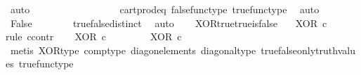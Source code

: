 \begin{isabellebody}
\ auto\isanewline
\ \ \ \ \isamarkupfalse%
\ \isamarkupfalse%
\ {\isachardoublequoteopen}{\isasymt}\ {\isacharequal}{\kern0pt}\ {\isasymf}{\isachardoublequoteclose}\isanewline
\ \ \ \ \ \ \isamarkupfalse%
\ cart{\isacharunderscore}{\kern0pt}prod{\isacharunderscore}{\kern0pt}eq{}\ false{\isacharunderscore}{\kern0pt}func{\isacharunderscore}{\kern0pt}type\ true{\isacharunderscore}{\kern0pt}func{\isacharunderscore}{\kern0pt}type\ \isamarkupfalse%
\ auto\isanewline
\ \ \ \ \isamarkupfalse%
\ \isamarkupfalse%
\ False\isanewline
\ \ \ \ \ \ \isamarkupfalse%
\ true{\isacharunderscore}{\kern0pt}false{\isacharunderscore}{\kern0pt}distinct\ \isamarkupfalse%
\ auto\isanewline
\ \ \isamarkupfalse%
\isanewline
{}\isamarkupfalse%
%
\endisatagproof
{\isafoldproof}%
%
\isadelimproof
\isanewline
%
\endisadelimproof
\isanewline
{}\isamarkupfalse%
\ XOR{\isacharunderscore}{\kern0pt}true{\isacharunderscore}{\kern0pt}true{\isacharunderscore}{\kern0pt}is{\isacharunderscore}{\kern0pt}false{\isacharcolon}{\kern0pt}\isanewline
\ \ \ {\isachardoublequoteopen}XOR\ {\isasymcirc}\isactrlsub c\ \ {\isasymlangle}{\isasymt}{\isacharcomma}{\kern0pt}{\isasymt}{\isasymrangle}\ {\isacharequal}{\kern0pt}\ {\isasymf}{\isachardoublequoteclose}\isanewline
%
\isadelimproof
%
\endisadelimproof
%
\isatagproof
{}\isamarkupfalse%
{\isacharparenleft}{\kern0pt}rule\ ccontr{\isacharparenright}{\kern0pt}\isanewline
\ \ \isamarkupfalse%
\ {\isachardoublequoteopen}XOR\ {\isasymcirc}\isactrlsub c\ {\isasymlangle}{\isasymt}{\isacharcomma}{\kern0pt}{\isasymt}{\isasymrangle}\ {\isasymnoteq}\ {\isasymf}{\isachardoublequoteclose}\isanewline
\ \ \isamarkupfalse%
\ \isamarkupfalse%
\ {\isachardoublequoteopen}XOR\ {\isasymcirc}\isactrlsub c\ {\isasymlangle}{\isasymt}{\isacharcomma}{\kern0pt}{\isasymt}{\isasymrangle}\ \ {\isacharequal}{\kern0pt}\ {\isasymt}{\isachardoublequoteclose}\isanewline
\ \ \ \ \isamarkupfalse%
\ {\isacharparenleft}{\kern0pt}metis\ XOR{\isacharunderscore}{\kern0pt}type\ comp{\isacharunderscore}{\kern0pt}type\ diag{\isacharunderscore}{\kern0pt}on{\isacharunderscore}{\kern0pt}elements\ diagonal{\isacharunderscore}{\kern0pt}type\ true{\isacharunderscore}{\kern0pt}false{\isacharunderscore}{\kern0pt}only{\isacharunderscore}{\kern0pt}truth{\isacharunderscore}{\kern0pt}values\ true{\isacharunderscore}{\kern0pt}func{\isacharunderscore}{\kern0pt}type{\isacharparenright}{\kern0pt}\isanewline

\end{isabellebody}
